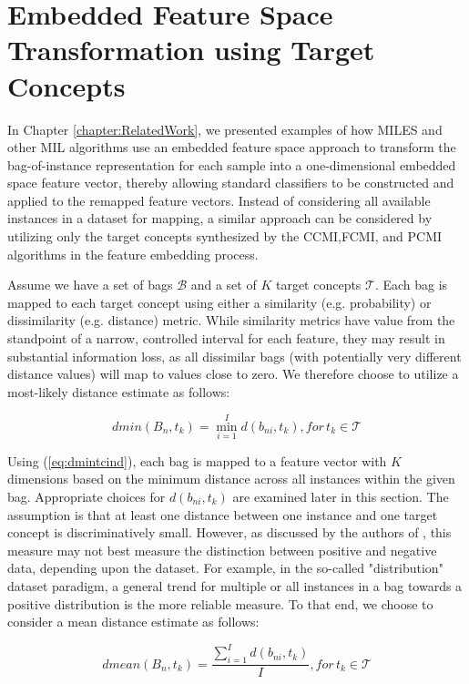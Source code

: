 \documentclass[12pt,dvips]{report}
\numberwithin{equation}{section}
\begin{document}
\section{Embedded Feature Space Transformation using Target Concepts} \label{sec:EmbeddedBase}
In Chapter \ref{chapter:RelatedWork}, we presented examples of how MILES and other MIL algorithms use an embedded feature space approach to transform the bag-of-instance representation for each sample into a one-dimensional embedded space feature vector, thereby allowing standard classifiers to be constructed and applied to the remapped feature vectors.  Instead of considering all available instances in a dataset for mapping, a similar approach can be considered by utilizing only the target concepts synthesized by the CCMI,FCMI, and PCMI algorithms in the feature embedding process.

Assume we have a set of bags $\mathcal{B}$ and a set of  $K$ target concepts $\mathcal{T}$.  Each bag is mapped to each target concept using either a similarity (e.g. probability) or dissimilarity (e.g. distance) metric.  While similarity metrics have value from the standpoint of a narrow, controlled interval for each feature, they may result in substantial information loss, as all dissimilar bags (with potentially very different distance values) will map to values close to zero.  We therefore choose to utilize a most-likely distance estimate as follows:

\begin{equation} \label{eq:dmintcind}
dmin(B_{n},t_{k}) = \min_{i=1}^{I} d(b_{ni},t_{k}), for \, t_{k} \in \mathcal{T}
\end{equation}

Using (\ref{eq:dmintcind}), each bag is mapped to a feature vector with $K$ dimensions based on the minimum distance across all instances within the given bag.  Appropriate choices for $d(b_{ni},t_{k})$ are examined later in this section.  The assumption is that at least one distance between one instance and one target concept is discriminatively small.  However, as discussed by the authors of \cite{chap14}, this measure may not best measure the distinction between positive and negative data, depending upon the dataset.  For example, in the so-called "distribution" dataset paradigm, a general trend for multiple or all instances in a bag towards a positive distribution is the more reliable measure.  To that end, we choose to consider a mean distance estimate as follows:

\begin{equation} \label{eq:dmeantcind}
dmean(B_{n},t_{k}) = \frac{\sum_{i=1}^{I} d(b_{ni},t_{k})}{I}, for \, t_{k} \in \mathcal{T}
\end{equation}
\end{document}
